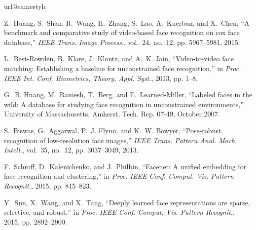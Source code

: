 \documentclass[10pt,journal,cspaper,compsoc]{IEEEtran}
\begin{document}
\begin{thebibliography}{10}
\providecommand{\url}[1]{#1}
\csname url@samestyle\endcsname
\providecommand{\newblock}{\relax}
\providecommand{\bibinfo}[2]{#2}
\providecommand{\BIBentrySTDinterwordspacing}{\spaceskip=0pt\relax}
\providecommand{\BIBentryALTinterwordstretchfactor}{4}
\providecommand{\BIBentryALTinterwordspacing}{\spaceskip=\fontdimen2\font plus
\BIBentryALTinterwordstretchfactor\fontdimen3\font minus
  \fontdimen4\font\relax}
\providecommand{\BIBforeignlanguage}[2]{{%
\expandafter\ifx\csname l@#1\endcsname\relax
\typeout{** WARNING: IEEEtran.bst: No hyphenation pattern has been}%
\typeout{** loaded for the language `#1'. Using the pattern for}%
\typeout{** the default language instead.}%
\else
\language=\csname l@#1\endcsname
\fi
#2}}
\providecommand{\BIBdecl}{\relax}
\BIBdecl

Z.~Huang, S.~Shan, R.~Wang, H.~Zhang, S.~Lao, A.~Kuerban, and X.~Chen, ``A
  benchmark and comparative study of video-based face recognition on cox face
  database,'' \emph{IEEE Trans. Image Process.}, vol.~24, no.~12, pp.
  5967--5981, 2015.

L.~Best-Rowden, B.~Klare, J.~Klontz, and A.~K. Jain, ``Video-to-video face
  matching: Establishing a baseline for unconstrained face recognition,'' in
  \emph{Proc. IEEE Int. Conf. Biometrics, Theory, Appl. Syst.}, 2013, pp. 1--8.

G.~B. Huang, M.~Ramesh, T.~Berg, and E.~Learned-Miller, ``Labeled faces in the
  wild: A database for studying face recognition in unconstrained
  environments,'' University of Massachusetts, Amherst, Tech. Rep. 07-49,
  October 2007.

S.~Biswas, G.~Aggarwal, P.~J. Flynn, and K.~W. Bowyer, ``Pose-robust
  recognition of low-resolution face images,'' \emph{IEEE Trans. Pattern Anal.
  Mach. Intell.}, vol.~35, no.~12, pp. 3037--3049, 2013.

F.~Schroff, D.~Kalenichenko, and J.~Philbin, ``Facenet: A unified embedding for
  face recognition and clustering,'' in \emph{Proc. IEEE Conf. Comput. Vis.
  Pattern Recognit.}, 2015, pp. 815--823.

Y.~Sun, X.~Wang, and X.~Tang, ``Deeply learned face representations are sparse,
  selective, and robust,'' in \emph{Proc. IEEE Conf. Comput. Vis. Pattern
  Recognit.}, 2015, pp. 2892--2900.


\end{thebibliography}
\end{document}
